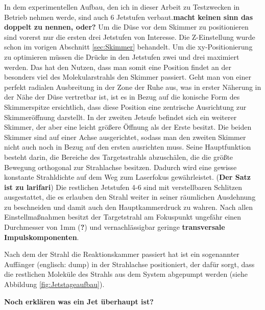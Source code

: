 In dem experimentellen Aufbau, den ich in dieser Arbeit zu Testzwecken in Betrieb nehmen werde, sind auch 6 Jetstufen verbaut.\textbf{macht keinen sinn das doppelt zu nennen, oder?}
Um die Düse vor dem Skimmer zu positionieren sind vorerst nur die ersten drei Jetstufen von Interesse. Die Z-Einstellung wurde schon im vorigen Abschnitt \ref{sec:Skimmer} behandelt. Um die xy-Positionierung zu optimieren müssen die Drücke in den Jetstufen zwei und drei maximiert werden. Das hat den Nutzen, dass man somit eine Position findet an der besonders viel des Molekularstrahls den Skimmer passiert. Geht man von einer perfekt radialen Ausbreitung in der Zone der Ruhe aus, was in erster Näherung in der Nähe der Düse vertretbar ist, ist es in Bezug auf die konische Form des Skimmerspitze ersichtlich, dass diese Position eine zentrische Ausrichtung zur Skimmeröffnung darstellt. 
In der zweiten Jetsufe befindet sich ein weiterer Skimmer, der aber eine leicht größere Öffnung als der Erste besitzt. Die beiden Skimmer sind auf einer Achse ausgerichtet, sodass man den zweiten Skimmer nicht auch noch in Bezug auf den ersten ausrichten muss. Seine Hauptfunktion besteht darin, die Bereiche des Targetsstrahls abzuschälen, die die größte Bewegung orthogonal zur Strahlachse besitzen. Dadurch wird eine gewisse konstante Strahldichte auf dem Weg zum Laserfokus gewährleistet. (\textbf{Der Satz ist zu larifari}) 
Die restlichen Jetstufen 4-6 sind mit verstellbaren Schlitzen ausgestattet, die es erlauben den Strahl weiter in seiner räumlichen Ausdehnung zu beschneiden und damit auch den Hauptkammerdruck zu wahren. Nach allen Einstellmaßnahmen besitzt der Targetstrahl am Fokuspunkt ungefähr einen Durchmesser von 1mm (\textbf{?}) und vernachlässigbar geringe \textbf{transversale Impulskomponenten}.

Nach dem der Strahl die Reaktionskammer passiert hat ist ein sogenannter Auffänger (englisch: dump) in der Strahlachse positioniert, der dafür sorgt, dass die restlichen Moleküle des Strahls aus dem System abgepumpt werden (siehe Abbildung \ref{fig:Jetstageaufbau}).

\textbf{Noch erklären was ein Jet überhaupt ist?}
%
%
%
%
%
%
